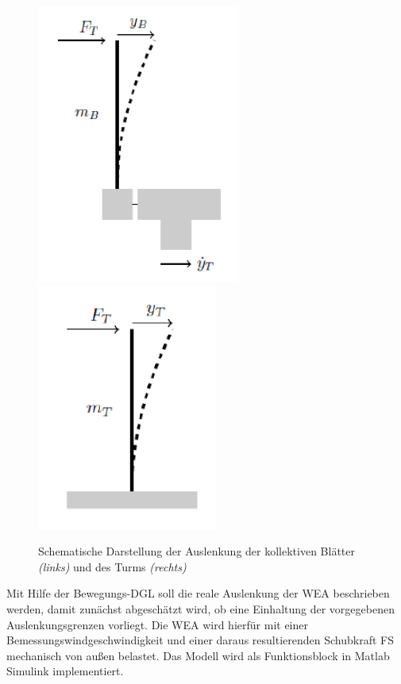 \begin{figure}[H]
    \centering
    \includegraphics[scale=0.5]{Bilder/Kapitel 6/Auslenkung_Blatt.PNG}
    \includegraphics[scale=0.5]{Bilder/Kapitel 6/Auslenkung_Turm.PNG}
    \caption{Schematische Darstellung der Auslenkung der kollektiven Blätter \textit{(links)} und des Turms \textit{(rechts)}}
    \label{fig:AuslenkungTurmBlatt}
\end{figure}
\newpage
Mit Hilfe der Bewegungs-DGL soll die reale Auslenkung der WEA beschrieben werden, damit zunächst abgeschätzt wird, ob eine Einhaltung der vorgegebenen Auslenkungsgrenzen vorliegt. Die WEA wird hierfür mit einer Bemessungswindgeschwindigkeit und einer daraus resultierenden Schubkraft \acs{FS} mechanisch von außen belastet. Das Modell wird als Funktionsblock in Matlab Simulink implementiert. 

